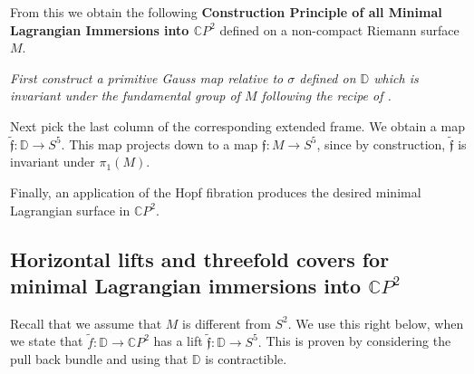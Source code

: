 \documentclass[a4paper,11pt]{amsart}
\theoremstyle{definition}
\numberwithin{equation}{section}
\newcommand{\C}{\mathbb{C}}
\newcommand{\D}{\mathbb{D}}
\newcommand{\f}{\mathfrak{f}}
\begin{document}
 From this we obtain the following 
 {\bf Construction Principle of all Minimal Lagrangian  Immersions into $\C P^2$}
 defined on a non-compact Riemann surface $M$.
   
{\it First construct a primitive Gauss map relative to $\sigma$ defined on $\D$ which is invariant under the fundamental group of $M$ following the recipe of \cite{DoKoMa}. 

Next pick  the last column of the corresponding extended frame. We obtain a map 
 $\tilde{\f} :\D \rightarrow S^5$. 
This map  projects down to a map $\f:M \rightarrow S^5$, since by construction,  $\tilde{\f} $ is invariant under $\pi_1(M)$. 
 
Finally, an application of the Hopf fibration produces the desired minimal Lagrangian surface in $\C P^2$.}
 
  \subsection{Horizontal lifts and threefold covers for minimal Lagrangian immersions into \texorpdfstring{$\C P^2$}{}}
  \label{subsection: general case}
 
Recall that we assume that $M$ is different from $S^2$. We use this right below,
  when we state that  $\tilde{f}: \D \rightarrow \C P^2$  has a lift 
  $\tilde{\f}: \D \rightarrow S^5.$
   This is proven by considering the pull back bundle and using that $\D$ is contractible.
   
\end{document}
